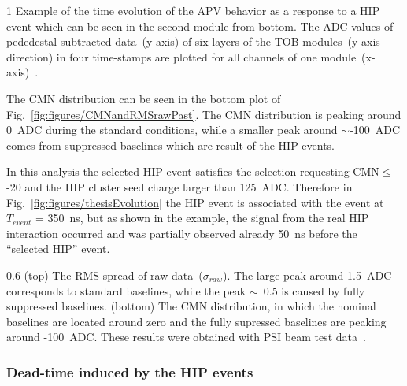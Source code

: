                  {1}       %
                 {Example of the time evolution of the APV behavior as a response to a HIP event which can be seen in the second module from bottom. The ADC values of pededestal subtracted data~(y-axis) of six layers of the TOB modules~(y-axis direction) in four time-stamps are plotted for all channels of one module~(x-axis)~\cite{Bainbridge:2004jc}.} %

The CMN distribution can be seen in the bottom plot of Fig.~\ref{fig:figures/CMNandRMSrawPast}. The CMN distribution is peaking around 0~ADC during the standard conditions, while a smaller peak around $\sim$-100~ADC comes from suppressed baselines which are result of the HIP events. 

In this analysis the selected HIP event satisfies the selection requesting CMN$\leq$-20 and the HIP cluster seed charge larger than 125~ADC. Therefore in Fig.~\ref{fig:figures/thesisEvolution} the HIP event is associated with the event at $T_{event}$ = 350~ns, but as shown in the example, the signal from the real HIP interaction occurred and was partially observed already 50~ns before the ``selected HIP'' event.

                 {0.6}       %
                 {(top) The RMS spread of raw data~($\sigma_{raw}$). The large peak around 1.5~ADC corresponds to standard baselines, while the peak $\sim$~0.5 is caused by fully suppressed baselines. (bottom) The CMN distribution, in which the nominal baselines are located around zero and the fully supressed baselines are peaking around -100~ADC. These results were obtained with PSI beam test data~\cite{Bainbridge:2004jc}.} %



\subsubsection{Dead-time induced by the HIP events~\label{sec:deadtimePast}}

